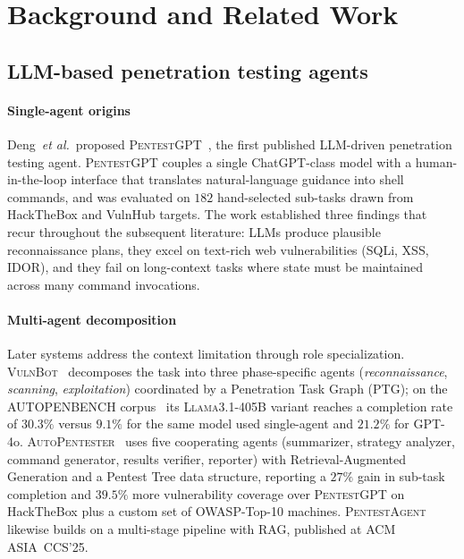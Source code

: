 
\section{Background and Related Work}
\label{sec:related}

\subsection{LLM-based penetration testing agents}
\label{sec:related:llm}

\paragraph{Single-agent origins}
Deng~\emph{et al.}~proposed \textsc{PentestGPT}~\cite{pentestgpt24}, the first
published LLM-driven penetration testing agent. \textsc{PentestGPT} couples a
single ChatGPT-class model with a human-in-the-loop interface that translates
natural-language guidance into shell commands, and was evaluated on $182$
hand-selected sub-tasks drawn from HackTheBox and VulnHub targets. The work
established three findings that recur throughout the subsequent literature:
LLMs produce plausible reconnaissance plans, they excel on text-rich web
vulnerabilities (SQLi, XSS, IDOR), and they fail on long-context tasks where
state must be maintained across many command invocations.

\paragraph{Multi-agent decomposition}
Later systems address the context limitation through role specialization.
\textsc{VulnBot}~\cite{vulnbot25} decomposes the task into three
phase-specific agents (\emph{reconnaissance}, \emph{scanning}, \emph{exploitation})
coordinated by a Penetration Task Graph (PTG); on the
AUTOPENBENCH corpus~\cite{autopenbench24} its \textsc{Llama3.1-405B} variant
reaches a completion rate of $30.3\%$ versus $9.1\%$ for the same model used
single-agent and $21.2\%$ for GPT-4o.
\textsc{AutoPentester}~\cite{autopentester25} uses five cooperating agents
(summarizer, strategy analyzer, command generator, results verifier, reporter)
with Retrieval-Augmented Generation and a Pentest Tree data structure,
reporting a $27\%$ gain in sub-task completion and $39.5\%$ more vulnerability
coverage over \textsc{PentestGPT} on HackTheBox plus a custom set of OWASP-Top-10
machines.
\textsc{PentestAgent}~\cite{pentestagent25} likewise builds on a multi-stage
pipeline with RAG, published at ACM ASIA~CCS'25.

